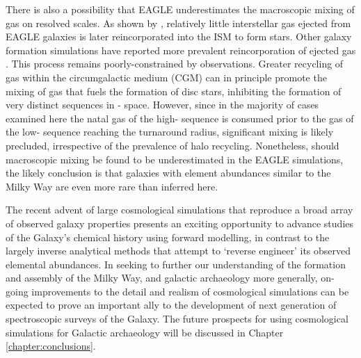 There is also a possibility that EAGLE underestimates the macroscopic mixing of gas on resolved scales. As shown by \citet{2016arXiv160406803C}, relatively little interstellar gas ejected from EAGLE galaxies is later reincorporated into the ISM to form stars. Other galaxy formation simulations have reported more prevalent reincorporation of ejected gas \citep[see, e.g.][]{2017MNRAS.470.4698A}. This process remains poorly-constrained by observations. Greater recycling of gas within the circumgalactic medium (CGM) can in principle promote the mixing of gas that fuels the formation of disc stars, inhibiting the formation of very distinct sequences in \afe{}-\feh{} space. However, since in the majority of cases examined here the natal gas of the high-\afe{} sequence is consumed prior to the gas of the low-\afe{} sequence reaching the turnaround radius, significant mixing is likely precluded, irrespective of the prevalence of halo recycling. Nonetheless, should macroscopic mixing be found to be underestimated in the EAGLE simulations, the likely conclusion is that galaxies with element abundances similar to the Milky Way are even more rare than inferred here.

The recent advent of large cosmological simulations that reproduce a broad array of observed galaxy properties presents an exciting opportunity to advance studies of the Galaxy's chemical history using forward modelling, in contrast to the largely inverse analytical methods that attempt to `reverse engineer' its observed elemental abundances. In seeking to further our understanding of the formation and assembly of the Milky Way, and galactic archaeology more generally, on-going improvements to the detail and realism of cosmological simulations can be expected to prove an important ally to the development of next generation of spectroscopic surveys of the Galaxy. The future prospects for using cosmological simulations for Galactic archaeology will be discussed in Chapter \ref{chapter:conclusions}.

